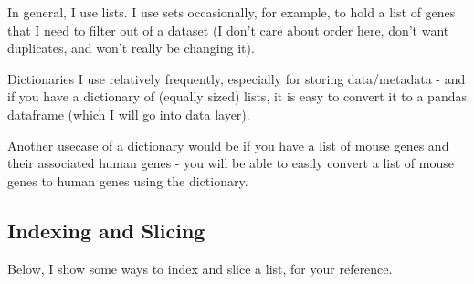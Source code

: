 \documentclass[
  letterpaper,
  DIV=11,
  numbers=noendperiod]{scrartcl}
\begin{document}
In general, I use lists. I use sets occasionally, for example, to hold a
list of genes that I need to filter out of a dataset (I don't care about
order here, don't want duplicates, and won't really be changing it).

Dictionaries I use relatively frequently, especially for storing
data/metadata - and if you have a dictionary of (equally sized) lists,
it is easy to convert it to a pandas dataframe (which I will go into
data layer).

Another usecase of a dictionary would be if you have a list of mouse
genes and their associated human genes - you will be able to easily
convert a list of mouse genes to human genes using the dictionary.

\subsection{Indexing and Slicing}\label{indexing-and-slicing}

Below, I show some ways to index and slice a list, for your reference.
\end{document}
